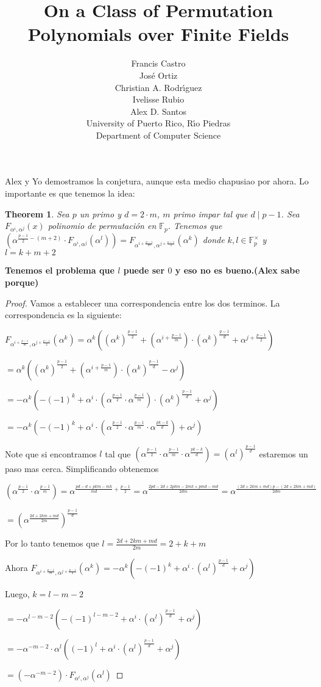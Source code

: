 \documentclass[12pt]{article}
\title{On a Class of Permutation Polynomials over Finite Fields}
\author{Francis Castro \\ Jos\'e Ortiz \\ Christian A. Rodr\'{\i}guez \\ Ivelisse Rubio \\ Alex D. Santos \\ University of Puerto Rico, R\'{\i}o Piedras \\ Department of Computer Science}
\date{}
\newtheorem{theorem}{Theorem}
\begin{document}
\maketitle

Alex y Yo demostramos la conjetura, aunque esta medio chapusiao por ahora. Lo importante es que tenemos la idea:
\begin{theorem}\label{thm:impar}
Sea $p$ un primo y $d = 2\cdot m$, $m$ primo impar tal que $d\mid p-1$. Sea $F_{\alpha^i,\alpha^j}(x)$ polinomio de permutación en $\mathbb{F}_p$. Tenemos que $(\alpha^{\frac{p-1}{2}-\left(m+2\right)}\cdot F_{\alpha^i,\alpha^j}(\alpha^l)) = F_{\alpha^{i+\frac{p-1}{m}},\alpha^{j+\frac{p-1}{2}}}(\alpha^{k})$ donde $k,l \in \mathbb{F}_p^\times$ y $l=k+m+2$    
\end{theorem}


\textbf{Tenemos el problema que $l$ puede ser $0$ y eso no es bueno.(Alex sabe porque)}
\linebreak

\begin{proof}
Vamos a establecer una correspondencia entre los dos terminos. La correspondencia es la siguiente:

$F_{\alpha^{i+\frac{p-1}{m}},\alpha^{j+\frac{p-1}{2}}}(\alpha^{k}) = \alpha^k((\alpha^k)^{\frac{p-1}{2}}+(\alpha^{i+\frac{p-1}{m}})\cdot(\alpha^k)^{\frac{p-1}{d}}+\alpha^{j+\frac{p-1}{2}})$

$ = \alpha^k((\alpha^k)^{\frac{p-1}{2}}+(\alpha^{i+\frac{p-1}{m}})\cdot(\alpha^k)^{\frac{p-1}{d}}-\alpha^{j})$

$ = -\alpha^k(-(-1)^k+\alpha^{i}\cdot (\alpha^{\frac{p-1}{2}}\cdot \alpha^{\frac{p-1}{m}})\cdot(\alpha^k)^{\frac{p-1}{d}}+\alpha^{j})$

$ = -\alpha^k(-(-1)^k+\alpha^{i}\cdot (\alpha^{\frac{p-1}{2}}\cdot \alpha^{\frac{p-1}{m}} \cdot \alpha^{\frac{pk-k}{d}})+\alpha^{j})$

Note que si encontramos $l$ tal que $(\alpha^{\frac{p-1}{2}}\cdot \alpha^{\frac{p-1}{m}} \cdot \alpha^{\frac{pk-k}{d}}) = (\alpha^l)^{\frac{p-1}{d}}$ estaremos un paso mas cerca. Simplificando obtenemos

$(\alpha^{\frac{p-1}{2}}\cdot \alpha^{\frac{p-1}{m}}) = \alpha^{\frac{pd-d+pkm-mk}{md}+\frac{p-1}{2}}=\alpha^{\frac{2pd-2d+2pkm-2mk+pmd-md}{2dm}} = \alpha^{\frac{\left( 2d+2km+md \right)p-\left( 2d+2km+md \right)}{2dm}}$

$ = (\alpha^{\frac{2d+2km+md}{2m}})^{\frac{p-1}{d}} $

Por lo tanto tenemos que $l=\frac{2d+2km+md}{2m}=2+k+m$

Ahora $F_{\alpha^{i+\frac{p-1}{m}},\alpha^{j+\frac{p-1}{2}}}(\alpha^{k}) = -\alpha^k(-(-1)^k+\alpha^{i}\cdot (\alpha^{l})^{\frac{p-1}{d}}+\alpha^{j})$

Luego, $k = l-m-2$

$ = -\alpha^{l-m-2}(-(-1)^{l-m-2}+\alpha^{i}\cdot (\alpha^{l})^{\frac{p-1}{d}}+\alpha^{j})$

$ = -\alpha^{-m-2}\cdot \alpha^{l}((-1)^{l}+\alpha^{i}\cdot (\alpha^{l})^{\frac{p-1}{d}}+\alpha^{j})$

$ = (-\alpha^{-m-2}) \cdot F_{\alpha^i,\alpha^j}(\alpha^l)$
\end{proof}
\end{document}
